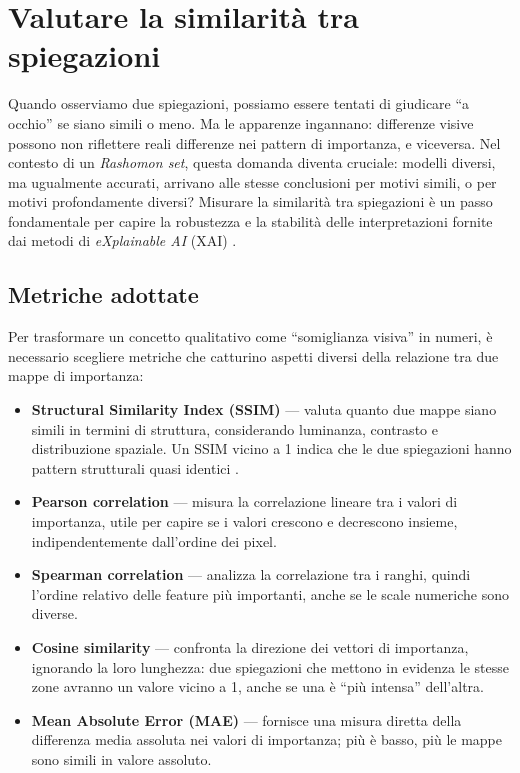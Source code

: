 \documentclass{article}
\begin{document}
\section{Valutare la similarità tra spiegazioni}

Quando osserviamo due spiegazioni, possiamo essere tentati di giudicare ``a
occhio'' se siano simili o meno. Ma le apparenze ingannano: differenze visive
possono non riflettere reali differenze nei pattern di importanza, e viceversa.
Nel contesto di un \emph{Rashomon set}, questa domanda diventa cruciale:
modelli diversi, ma ugualmente accurati, arrivano alle stesse conclusioni per
motivi simili, o per motivi profondamente diversi? Misurare la similarità tra
spiegazioni è un passo fondamentale per capire la robustezza e la stabilità
delle interpretazioni fornite dai metodi di \emph{eXplainable AI} (XAI)
\citep{samek2016evaluating, mueller2023rashomon}.

\subsection{Metriche adottate}
Per trasformare un concetto qualitativo come ``somiglianza visiva'' in numeri,
è necessario scegliere metriche che catturino aspetti diversi della relazione
tra due mappe di importanza:

\begin{itemize}
      \item \textbf{Structural Similarity Index (SSIM)} — valuta quanto due mappe siano simili in termini di struttura, considerando luminanza, contrasto e distribuzione spaziale. Un SSIM vicino a 1 indica che le due spiegazioni hanno pattern strutturali quasi identici \citep{wang2004ssim}.
      \item \textbf{Pearson correlation} — misura la correlazione lineare tra i valori di importanza, utile per capire se i valori crescono e decrescono insieme, indipendentemente dall’ordine dei pixel.
      \item \textbf{Spearman correlation} — analizza la correlazione tra i ranghi, quindi l’ordine relativo delle feature più importanti, anche se le scale numeriche sono diverse.
      \item \textbf{Cosine similarity} — confronta la direzione dei vettori di importanza, ignorando la loro lunghezza: due spiegazioni che mettono in evidenza le stesse zone avranno un valore vicino a 1, anche se una è ``più intensa'' dell’altra.
      \item \textbf{Mean Absolute Error (MAE)} — fornisce una misura diretta della differenza media assoluta nei valori di importanza; più è basso, più le mappe sono simili in valore assoluto.
\end{itemize}
\end{document}
